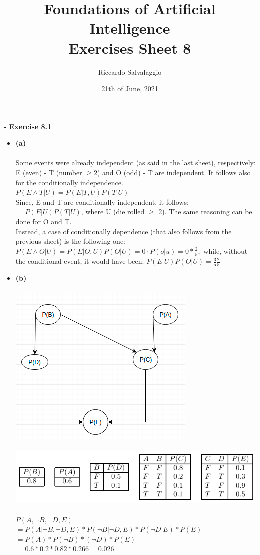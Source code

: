 \documentclass{article}
\title{Foundations of Artificial Intelligence\\ Exercises Sheet 8}
\author{Riccardo Salvalaggio}
\date{21th of June, 2021}
\begin{document}
\maketitle
\newpage

\textbf{- Exercise 8.1}\\
\begin{itemize}
\item \textbf{(a)}\\\\
Some events were already independent (as said in the last sheet), respectively: E (even) - T (number $\ge 2$) and O (odd) - T are independent. It follows also for the conditionally independence.\\ $P(E \wedge T|U) = P(E|T, U)P(T|U)$\\
Since, E and T are conditionally independent, it follows:\\
$= P(E|U)P(T|U)$, where U (die rolled $\ge$ 2). The same reasoning can be done for O and T.\\
Instead, a case of conditionally dependence (that also follows from the previous sheet) is the following one:\\
$P(E \wedge O|U) =P(E|O, U)P(O|U) = 0\cdot P(o | u) = 0*\frac{2}{5}, $ while, without the conditional event, it would have been: $P(E|U)P(O|U) = \frac{3}{5} \frac{2}{5}$


\item \textbf{(b)}\\\\
\includegraphics[scale=0.5]{1.png}\\\\
\includegraphics[scale=0.5]{2.png}\\\\
$P(A,\neg B,\neg D, E)$\\
$=P(A|\neg B, \neg D, E)*P(\neg B| \neg D, E)*P(\neg D| E)*P(E)$\\
$=P(A)*P(\neg B)*(\neg D)*P(E)$\\
$=0.6*0.2*0.82*0.266 = 0.026$\\


\end{itemize}
\end{document}
